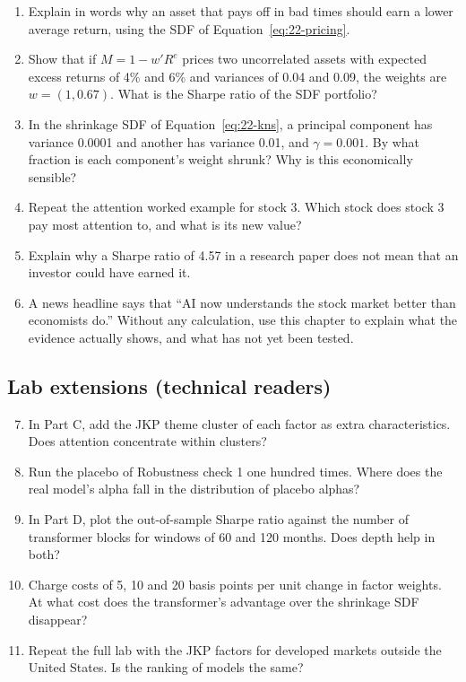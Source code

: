 \begin{enumerate}
  \item Explain in words why an asset that pays off in bad times should earn a lower average return, using the SDF of Equation~\eqref{eq:22-pricing}.
  \item Show that if $M = 1 - w'R^e$ prices two uncorrelated assets with expected excess returns of 4\% and 6\% and variances of 0.04 and 0.09, the weights are $w = (1, 0.67)$. What is the Sharpe ratio of the SDF portfolio?
  \item In the shrinkage SDF of Equation~\eqref{eq:22-kns}, a principal component has variance 0.0001 and another has variance 0.01, and $\gamma = 0.001$. By what fraction is each component's weight shrunk? Why is this economically sensible?
  \item Repeat the attention worked example for stock 3. Which stock does stock 3 pay most attention to, and what is its new value?
  \item Explain why a Sharpe ratio of 4.57 in a research paper does not mean that an investor could have earned it.
  \item A news headline says that ``AI now understands the stock market better than economists do.'' Without any calculation, use this chapter to explain what the evidence actually shows, and what has not yet been tested.
\end{enumerate}

\subsection*{Lab extensions (technical readers)}

\begin{enumerate}
  \setcounter{enumi}{6}
  \item In Part C, add the JKP theme cluster of each factor as extra characteristics. Does attention concentrate within clusters?
  \item Run the placebo of Robustness check 1 one hundred times. Where does the real model's alpha fall in the distribution of placebo alphas?
  \item In Part D, plot the out-of-sample Sharpe ratio against the number of transformer blocks for windows of 60 and 120 months. Does depth help in both?
  \item Charge costs of 5, 10 and 20 basis points per unit change in factor weights. At what cost does the transformer's advantage over the shrinkage SDF disappear?
  \item Repeat the full lab with the JKP factors for developed markets outside the United States. Is the ranking of models the same?
\end{enumerate}
